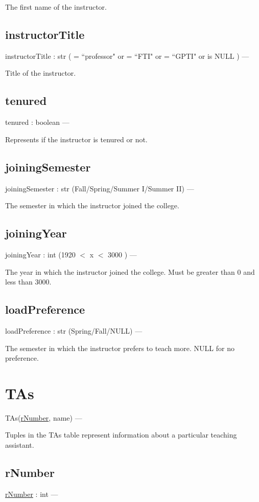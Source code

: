 \documentclass[10pt]{article}
\begin{document}
    The first name of the instructor.
    
    \subsection{instructorTitle}
    instructorTitle : str ( = ``professor" or = ``FTI" or = ``GPTI" or is NULL ) ---
    
    Title of the instructor.
    
    \subsection{tenured}    
    tenured : boolean ---
    
    Represents if the instructor is tenured or not.
    
    \subsection{joiningSemester}
    joiningSemester : str (Fall/Spring/Summer I/Summer II) ---
    
    The semester in which the instructor joined the college.
    
    \subsection{joiningYear}
    joiningYear : int (1920 $<$ x $<$ 3000 ) ---
    
    The year in which the instructor joined the college. Must be greater than 0 and less than 3000.
    
    \subsection{loadPreference}
    loadPreference : str (Spring/Fall/NULL) ---
    
    The semester in which the instructor prefers to teach more. NULL for no preference.
    
    
\section{TAs}
TAs(\underline{rNumber}, name) ---

Tuples in the TAs table represent information about a particular teaching assistant.

	\subsection{rNumber}
		\underline{rNumber} : int ---
		
\end{document}
